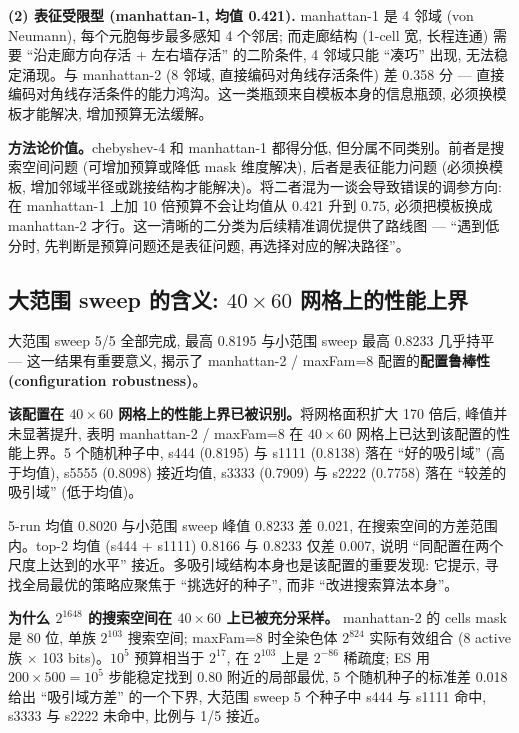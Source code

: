 \noindent\textbf{(2) 表征受限型 (manhattan-1, 均值 0.421).}
manhattan-1 是 4 邻域 (von Neumann), 每个元胞每步最多感知 4 个邻居; 而走廊结构 (1-cell 宽, 长程连通) 需要 ``沿走廊方向存活 + 左右墙存活'' 的二阶条件, 4 邻域只能 ``凑巧'' 出现, 无法稳定涌现。与 manhattan-2 (8 邻域, 直接编码对角线存活条件) 差 0.358 分 --- 直接编码对角线存活条件的能力鸿沟。这一类瓶颈来自模板本身的信息瓶颈, 必须换模板才能解决, 增加预算无法缓解。

\noindent\textbf{方法论价值。}chebyshev-4 和 manhattan-1 都得分低, 但分属不同类别。前者是搜索空间问题 (可增加预算或降低 mask 维度解决), 后者是表征能力问题 (必须换模板, 增加邻域半径或跳接结构才能解决)。将二者混为一谈会导致错误的调参方向: 在 manhattan-1 上加 10 倍预算不会让均值从 0.421 升到 0.75, 必须把模板换成 manhattan-2 才行。这一清晰的二分类为后续精准调优提供了路线图 --- ``遇到低分时, 先判断是预算问题还是表征问题, 再选择对应的解决路径''。

\subsection{大范围 sweep 的含义: $40 \times 60$ 网格上的性能上界}

大范围 sweep 5/5 全部完成, 最高 0.8195 与小范围 sweep 最高 0.8233 几乎持平 --- 这一结果有重要意义, 揭示了 manhattan-2 / maxFam=8 配置的\textbf{配置鲁棒性 (configuration robustness)}。

\noindent\textbf{该配置在 $40 \times 60$ 网格上的性能上界已被识别。}将网格面积扩大 170 倍后, 峰值并未显著提升, 表明 manhattan-2 / maxFam=8 在 $40 \times 60$ 网格上已达到该配置的性能上界。5 个随机种子中, s444 (0.8195) 与 s1111 (0.8138) 落在 ``好的吸引域'' (高于均值), s5555 (0.8098) 接近均值, s3333 (0.7909) 与 s2222 (0.7758) 落在 ``较差的吸引域'' (低于均值)。

5-run 均值 0.8020 与小范围 sweep 峰值 0.8233 差 0.021, 在搜索空间的方差范围内。top-2 均值 (s444 + s1111) 0.8166 与 0.8233 仅差 0.007, 说明 ``同配置在两个尺度上达到的水平'' 接近。多吸引域结构本身也是该配置的重要发现: 它提示, 寻找全局最优的策略应聚焦于 ``挑选好的种子'', 而非 ``改进搜索算法本身''。

\noindent\textbf{为什么 $2^{1648}$ 的搜索空间在 $40 \times 60$ 上已被充分采样。}
manhattan-2 的 cells mask 是 80 位, 单族 $2^{103}$ 搜索空间; maxFam=8 时全染色体 $2^{824}$ 实际有效组合 (8 active 族 $\times$ 103 bits)。$10^5$ 预算相当于 $2^{17}$, 在 $2^{103}$ 上是 $2^{-86}$ 稀疏度; ES 用 $200 \times 500 = 10^5$ 步能稳定找到 $0.80$ 附近的局部最优, 5 个随机种子的标准差 0.018 给出 ``吸引域方差'' 的一个下界, 大范围 sweep 5 个种子中 s444 与 s1111 命中, s3333 与 s2222 未命中, 比例与 1/5 接近。

